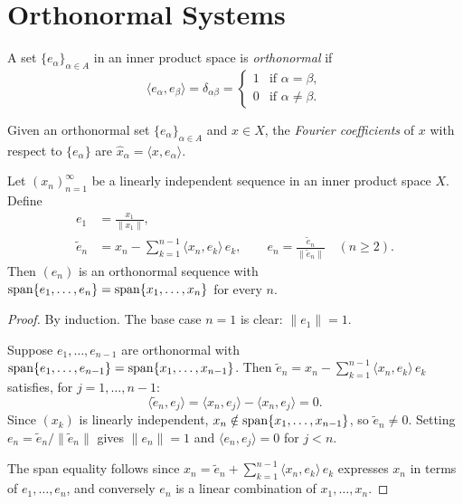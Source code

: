 \documentclass[11pt,a4paper]{article}
\begin{document}

\section{Orthonormal Systems}
\label{sec:orthonormal}

\begin{definition}
\label{def:orthonormal}
A set $\{e_\alpha\}_{\alpha \in A}$ in an inner product space is
\emph{orthonormal} if
\[
    \langle e_\alpha, e_\beta \rangle = \delta_{\alpha\beta}
    = \begin{cases}
        1 & \text{if } \alpha = \beta, \\
        0 & \text{if } \alpha \neq \beta.
      \end{cases}
\]
\end{definition}

\begin{definition}
\label{def:fourier}
Given an orthonormal set $\{e_\alpha\}_{\alpha \in A}$ and $x \in X$,
the \emph{Fourier coefficients} of $x$ with respect to
$\{e_\alpha\}$ are
$\hat{x}_\alpha = \langle x, e_\alpha \rangle$.
\end{definition}

\begin{theorem}
\label{thm:gram-schmidt}
Let $(x_n)_{n=1}^\infty$ be a linearly independent sequence in an inner
product space $X$. Define
\begin{align*}
    e_1 &= \frac{x_1}{\|x_1\|}, \\
    \tilde{e}_n &= x_n - \sum_{k=1}^{n-1}
                   \langle x_n, e_k \rangle\, e_k,
    \qquad e_n = \frac{\tilde{e}_n}{\|\tilde{e}_n\|}
    \quad (n \geq 2).
\end{align*}
Then $(e_n)$ is an orthonormal sequence with
$\operatorname{span}\{e_1, \ldots, e_n\} = \operatorname{span}\{x_1, \ldots, x_n\}$ for every $n$.
\end{theorem}

\begin{proof}
By induction. The base case $n = 1$ is clear: $\|e_1\| = 1$.

Suppose $e_1, \ldots, e_{n-1}$ are orthonormal with
$\operatorname{span}\{e_1, \ldots, e_{n-1}\} = \operatorname{span}\{x_1, \ldots, x_{n-1}\}$.
Then
$\tilde{e}_n = x_n - \sum_{k=1}^{n-1} \langle x_n, e_k \rangle\, e_k$
satisfies, for $j = 1, \ldots, n-1$:
\[
    \langle \tilde{e}_n, e_j \rangle
    = \langle x_n, e_j \rangle - \langle x_n, e_j \rangle = 0.
\]
Since $(x_k)$ is linearly independent,
$x_n \notin \operatorname{span}\{x_1, \ldots, x_{n-1}\}$, so $\tilde{e}_n \neq 0$.
Setting $e_n = \tilde{e}_n / \|\tilde{e}_n\|$ gives $\|e_n\| = 1$ and
$\langle e_n, e_j \rangle = 0$ for $j < n$.

The span equality follows since
$x_n = \tilde{e}_n + \sum_{k=1}^{n-1} \langle x_n, e_k \rangle\, e_k$
expresses $x_n$ in terms of $e_1, \ldots, e_n$, and conversely $e_n$ is
a linear combination of $x_1, \ldots, x_n$.
\end{proof}
\end{document}
